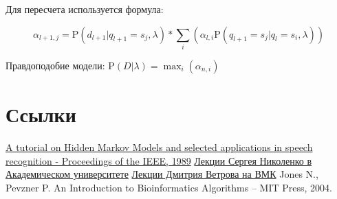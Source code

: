 \documentclass[letterpaper, 11pt]{article}
\newcommand{\prob}{\mathrm{P}}
\begin{document}
Для пересчета используется формула:

$$\alpha_{l+1,j}=\prob(d_{l+1}|q_{l+1}=s_j,\lambda)*\sum_i(\alpha_{l,i}\prob(q_{l+1}=s_j|q_{l}=s_i,\lambda))$$

Правдоподобие модели: $\prob(D|\lambda)=\max_i(\alpha_{n,i})$ 




\section{Ссылки}
\begingroup
\renewcommand{\section}[2]{}%
\begin{thebibliography}{7}
\href{http://www.ece.ucsb.edu/Faculty/Rabiner/ece259/Reprints/tutorial%20on%20hmm%20and%20applications.pdf}{A tutorial on Hidden Markov Models and selected applications in speech recognition - Proceedings of the IEEE, 1989}
\href{http://logic.pdmi.ras.ru/~sergey/teaching/asr/notes-09-hmm.pdf}{Лекции Сергея Николенко в Академическом университете}
\href{http://www.machinelearning.ru/wiki/images/8/83/GM12_3.pdf}{Лекции Дмитрия Ветрова на ВМК}
Jones N., Pevzner P. An Introduction to Bioinformatics Algorithms – MIT Press, 2004.
\end{thebibliography}
\end{document}
